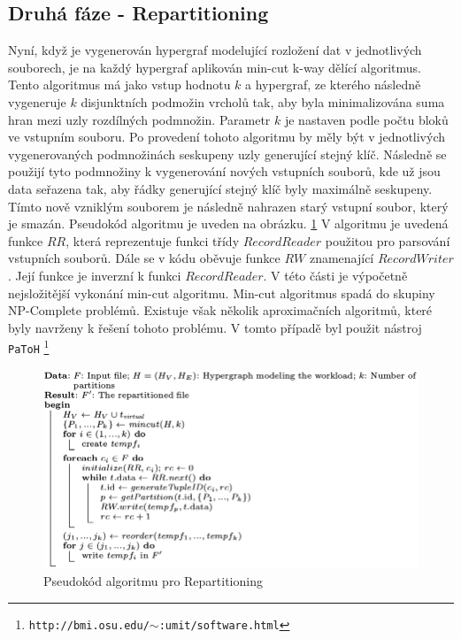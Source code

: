 \documentclass[thesis=M,czech]{FITthesis}[2012/06/26]
\begin{document}
\subsection{Druhá fáze - Repartitioning}
Nyní, když je vygenerován hypergraf modelující rozložení dat v jednotlivých souborech, je na každý hypergraf aplikován min-cut k-way dělící algoritmus. Tento algoritmus má jako vstup hodnotu $k$ a hypergraf, ze kterého následně vygeneruje $k$ disjunktních podmožin vrcholů tak, aby byla minimalizována suma hran mezi uzly rozdílných podmnožin. Parametr $k$ je nastaven podle počtu bloků ve vstupním souboru. Po provedení tohoto algoritmu by měly být v jednotlivých vygenerovaných podmnožinách seskupeny uzly generující stejný klíč. Následně se použijí tyto podmnožiny k vygenerování nových vstupních souborů, kde už jsou data seřazena tak, aby řádky generující stejný klíč byly maximálně seskupeny. Tímto nově vzniklým souborem je následně nahrazen starý vstupní soubor, který je smazán. Pseudokód algoritmu je uveden na obrázku. \ref{fig:alg2} V algoritmu je uvedená funkce $RR$, která reprezentuje funkci třídy $RecordReader$  použitou pro parsování vstupních souborů. Dále se v kódu oběvuje funkce $RW$ znamenající $RecordWriter$. Její funkce je inverzní k funkci $RecordReader$. V této části je výpočetně nejsložitější vykonání min-cut algoritmu. Min-cut algoritmus spadá do skupiny NP-Complete problémů. Existuje však několik aproximačních algoritmů, které byly navrženy k řešení tohoto problému. V tomto případě byl použit nástroj \texttt{PaToH} \footnote{\texttt{http://bmi.osu.edu/$\sim$:umit/software.html}}

\begin{figure}\centering
	\includegraphics[width=1\textwidth, angle=0]{files/alg2}
	\caption[Pseudokód algoritmu pro Repartitioning]
	{Pseudokód algoritmu pro Repartitioning}\label{fig:alg2}
\end{figure} 
\end{document}
